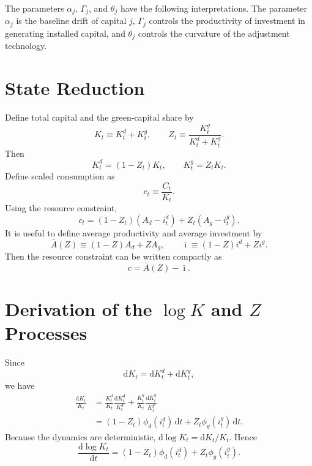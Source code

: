 \documentclass[11pt]{article}
\newcommand{\dd}{\mathrm{d}}
\newcommand{\Abar}{\bar A}
\newcommand{\ibar}{\bar\imath}
\begin{document}
The parameters $\alpha_j$, $\Gamma_j$, and $\theta_j$ have the following interpretations. The parameter $\alpha_j$ is the baseline drift of capital $j$, $\Gamma_j$ controls the productivity of investment in generating installed capital, and $\theta_j$ controls the curvature of the adjustment technology.

\section{State Reduction}

Define total capital and the green-capital share by
\begin{equation}
    K_t \equiv K^d_t+K^g_t,
    \qquad
    Z_t \equiv \frac{K^g_t}{K^d_t+K^g_t}.
\end{equation}
Then
\begin{equation}
    K^d_t=(1-Z_t)K_t,
    \qquad
    K^g_t=Z_tK_t.
\end{equation}
Define scaled consumption as
\begin{equation}
    c_t \equiv \frac{C_t}{K_t}.
\end{equation}
Using the resource constraint,
\begin{equation}
    c_t
    =
    (1-Z_t)(A_d-i^d_t)+Z_t(A_g-i^g_t).
\end{equation}
It is useful to define average productivity and average investment by
\begin{equation}
    \Abar(Z)\equiv (1-Z)A_d+ZA_g,
    \qquad
    \ibar\equiv (1-Z)i^d+Zi^g.
\end{equation}
Then the resource constraint can be written compactly as
\begin{equation}
    c=\Abar(Z)-\ibar.
\end{equation}

\section{Derivation of the $\log K$ and $Z$ Processes}

Since
\begin{equation}
    \dd K_t=\dd K^d_t+\dd K^g_t,
\end{equation}
we have
\begin{align}
    \frac{\dd K_t}{K_t}
    &=
    \frac{K^d_t}{K_t}\frac{\dd K^d_t}{K^d_t}
    +
    \frac{K^g_t}{K_t}\frac{\dd K^g_t}{K^g_t} \\
    &=
    (1-Z_t)\phi_d(i^d_t)\,\dd t
    +
    Z_t\phi_g(i^g_t)\,\dd t.
\end{align}
Because the dynamics are deterministic, $\dd\log K_t=\dd K_t/K_t$. Hence
\begin{equation}
    \boxed{
    \frac{\dd \log K_t}{\dd t}
    =
    (1-Z_t)\phi_d(i^d_t)+Z_t\phi_g(i^g_t).
    }
\end{equation}
\end{document}
